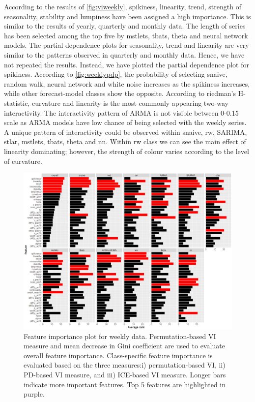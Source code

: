 \documentclass[11pt,a4paper,]{article}
\begin{document}
According to the results of \autoref{fig:viweekly}, spikiness, linearity, trend, strength of seasonality, stability and lumpiness have been assigned a high importance. This is similar to the results of yearly, quarterly and monthly data. The length of series has been selected among the top five by mstlets, tbats, theta and neural network models. The partial dependence plots for seasonality, trend and linearity are very similar to the patterns observed in quarterly and monthly data. Hence, we have not repeated the results. Instead, we have plotted the partial dependence plot for spikiness. According to \autoref{fig:weeklypdp}, the probability of selecting snaive, random walk, neural network and white noise increases as the spikiness increases, while other forecast-model classes show the opposite. According to riedman's H-statistic, curvature and linearity is the most commonly appearing two-way interactivity. The interactivity pattern of ARMA is not visible between 0-0.15 scale as ARMA models have low chance of being selected with the weekly series. A unique pattern of interactivity could be observed within snaive, rw, SARIMA, stlar, mstlets, tbats, theta and nn. Within rw class we can see the main effect of linearity dominating; however, the strength of colour varies according to the level of curvature.

\begin{figure}[h]

{\centering \includegraphics{figures/viweekly-1} 

}

\caption{Feature importance plot for weekly data. Permutation-based VI measure and mean decrease in Gini coefficient are used to evaluate overall feature importance. Class-specific feature importance is evaluated based on the three measures:i) permutation-based VI, ii) PD-based VI measure, and iii) ICE-based VI measure. Longer bars indicate more important features. Top 5 features are highlighted in purple.}\label{fig:viweekly}
\end{figure}
\end{document}

